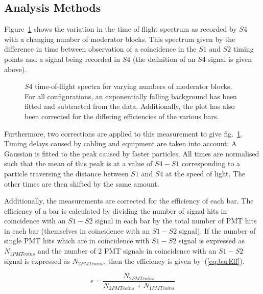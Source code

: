 \subsection{Analysis Methods}

	Figure~\ref{fig:s4tof} shows the variation in the time of flight spectrum as recorded by $S4$ with a changing number of moderator blocks.
	This spectrum given by the difference in time between observation of a coincidence in the $S1$ and $S2$ timing points and a signal being recorded in $S4$ (the definition of an $S4$ signal is given above).
	
	\begin{figure}[h]
		\begin{adjustbox}{max totalsize={.8\textwidth}{.5\textheight},center}
			
		\end{adjustbox}
		\caption{$S4$ time-of-flight spectra for varying numbers of moderator blocks. For all configurations, an exponentially falling background has been fitted and subtracted from the data. Additionally, the plot has also been corrected for the differing efficiencies of the various bars.}
		\label{fig:s4tof}	
	\end{figure}

	Furthermore, two corrections are applied to this measurement to give fig.~\ref{fig:s4tof}. 
	Timing delays caused by cabling and equipment are taken into account:
	A Gaussian is fitted to the peak caused by faster particles.
	All times are normalised such that the mean of this peak is at a value of $S4 - S1$ corresponding to a particle traversing the distance between $S1$ and $S4$ at the speed of light. 
	The other times are then shifted by the same amount.
	
	Additionally, the measurements are corrected for the efficiency of each bar. 
	The efficiency of a bar is calculated by dividing the number of signal hits in coincidence with an $S1-S2$ signal in each bar by the total number of PMT hits in each bar (themselves in coincidence with an $S1-S2$ signal). 
	If the number of single PMT hits which are in coincidence with $S1-S2$ signal is expressed as $N_{1PMTcoins}$ and the number of 2 PMT signals in coincidence with an $S1-S2$ signal is expressed as $N_{2PMTcoins}$, then the efficiency is given by~(\ref{eq:barEff}).
	
	\begin{equation}
		\epsilon = \frac{N_{2PMTcoins}}{N_{2PMTcoins}+N_{1PMTcoins}}
		\label{eq:barEff}
	\end{equation}
	
